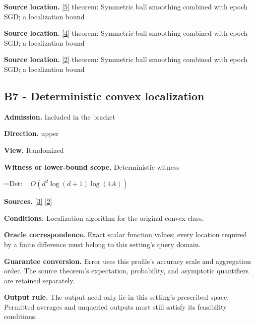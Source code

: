 \documentclass[10pt,a4paper]{article}
\newcommand{\AtlasMath}[1]{\par\begingroup\centering\setbox0=\hbox{$\displaystyle #1$}\ifdim\wd0>1.4\linewidth\typeout{ATLAS WIDE FORMULA: \the\wd0}\fi\ifdim\wd0>\linewidth\resizebox{\linewidth}{!}{\box0}\else\box0\fi\par\endgroup}
\begin{document}
\textbf{Source location.} \href{https://jmlr.org/papers/volume18/16-632/16-632.pdf}{[5]} theorem: Symmetric ball smoothing combined with epoch SGD; a localization bound



\textbf{Source location.} \href{https://arxiv.org/pdf/1006.2425}{[4]} theorem: Symmetric ball smoothing combined with epoch SGD; a localization bound



\textbf{Source location.} \href{https://www.mathnet.ru/php/archive.phtml?jrnid=mzm&option_lang=eng&paperid=1697&wshow=paper}{[2]} theorem: Symmetric ball smoothing combined with epoch SGD; a localization bound



\subsection{B7 - Deterministic convex localization}


\textbf{Admission.} Included in the bracket



\textbf{Direction.} upper



\textbf{View.} Randomized



\textbf{Witness or lower-bound scope.} Deterministic witness



\AtlasMath{\mathrm{Det}:\quad O(d^2\log(d+1)\log(4A))}


\textbf{Sources.} \href{https://arxiv.org/html/2607.16558v2}{[3]} \href{https://www.mathnet.ru/php/archive.phtml?jrnid=mzm&option_lang=eng&paperid=1697&wshow=paper}{[2]}



\textbf{Conditions.} Localization algorithm for the original convex class.



\textbf{Oracle correspondence.} Exact scalar function values; every location required by a finite difference must belong to this setting's query domain.



\textbf{Guarantee conversion.} Error uses this profile's accuracy scale and aggregation order. The source theorem's expectation, probability, and asymptotic quantifiers are retained separately.



\textbf{Output rule.} The output need only lie in this setting's prescribed space. Permitted averages and unqueried outputs must still satisfy its feasibility conditions.
\end{document}
